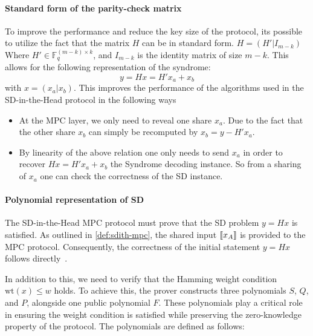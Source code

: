 \documentclass[11pt]{report}
\theoremstyle{definition}
\theoremstyle{plain}
\begin{document}
\paragraph{Standard form of the parity-check matrix}\label{sec:standard_form_of_the_parity_check_matrix}
To improve the performance and reduce the key size of the protocol, its possible to utilize the fact that the matrix $H$ can be in standard form. $H = (H'|I_{m-k}) $ Where $H' \in \mathbb{F}^{(m-k)\times k}_q$, and $I_{m-k}$ is the identity matrix of size $m-k$. This allows for the following representation of the syndrome:
\begin{equation}
  y = Hx = H'x_a + x_b\label{eq:standard_form_of_the_parity_check_matrix}
\end{equation}
with $x = (x_a | x_b)$. This improves the performance of the algorithms used in the SD-in-the-Head protocol in the following ways
\begin{itemize}
  \item At the MPC layer, we only need to reveal one share $x_a$. Due to the fact that the other share $x_b$ can simply be recomputed by $x_b = y - H'x_a$.
  \item By linearity of the above relation one only needs to send $x_a$ in order to recover $Hx = H'x_a + x_b$ the Syndrome decoding instance. So from a sharing of $x_a$ one can check the correctness of the SD instance.
\end{itemize}

\paragraph{Polynomial representation of SD}\label{sec:polynomial_representation}

The SD-in-the-Head MPC protocol must prove that the SD problem \( y = Hx \) is satisfied. As outlined in \autoref{def:sdith-mpc}, the shared input \(\llbracket x_A \rrbracket\) is provided to the MPC protocol. Consequently, the correctness of the initial statement \( y = Hx \) follows directly~\cite{feneuil2022syndrome}.

In addition to this, we need to verify that the Hamming weight condition \( \text{wt}(x) \leq w \) holds. To achieve this, the prover constructs three polynomials \( S \), \( Q \), and \( P \), alongside one public polynomial \( F \). These polynomials play a critical role in ensuring the weight condition is satisfied while preserving the zero-knowledge property of the protocol. The polynomials are defined as follows:
\end{document}
